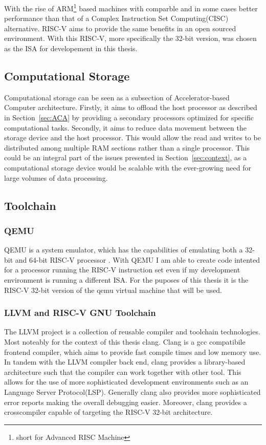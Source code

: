 With the rise of ARM\footnote{short for Advanced RISC Machine} based machines
with comparble and in some cases better performance than that of a Complex
Instruction Set Computing(CISC) alternative.\cite{Power_Struggle} RISC-V aims to
provide the same benefits in an open sourced environment. With this RISC-V, more
specifically the 32-bit version, was chosen as the ISA for developement in this
thesis.

\subsection{Computational Storage}
Computational storage can be seen as a subsection of Accelerator-based Computer
architecture. Firstly, it aims to offload the host processor as described in
Section~\ref{sec:ACA} by providing a secondary processors optimized for specific
computational tasks. Secondly, it aims to reduce data movement between the
storage device and the host processor. This would allow the read and writes to
be distributed among multiple RAM sections rather than a single processor. This
could be an integral part of the issues presented in Section~\ref{sec:context},
as a computational storage device would be scalable with the ever-growing need
for large volumes of data processing.


\subsection{Toolchain}
\subsubsection{QEMU}
QEMU is a system emulator, which has the capabilities of emulating both a 32-bit
and 64-bit RISC-V processor \cite{QEMU}. With QEMU I am able to create code intented
for a processor running the RISC-V instruction set even if my development
environment is running a different ISA. For the puposes of this thesis it is the
RISC-V 32-bit version of the qemu virtual machine that will be used.

\subsubsection{LLVM and RISC-V GNU Toolchain}
The LLVM project is a collection of reusable compiler and toolchain
technologies. Most noteably for the context of this thesis clang. Clang is a gcc
compatibile frontend compiler, which aims to provide fast compile times and low
memory use. In tandem with the LLVM compiler back end, clang provides a
library-based architecture such that the compiler can work together with other
tool. This allows for the use of more sophisticated development environments
such as an Language Server Protocol(LSP). Generally clang also provides more
sophisticated error reports making the overall debugging easier. Moreover, clang
provides a crosscompiler capable of targeting the RISC-V 32-bit architecture.

